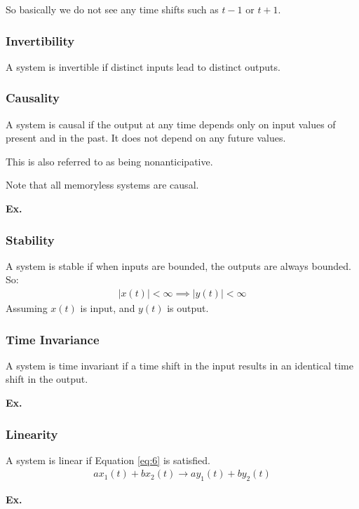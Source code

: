 \documentclass[12pt,letterpaper]{article} \usepackage{amsmath} \usepackage{graphicx} \usepackage[margin=1in]{geometry} \usepackage{longtable}  \usepackage{amssymb}
\begin{document}
	So basically we do not see any time shifts such as $t-1$ or $t+1$.
	
	\subsubsection{Invertibility}
	A system is invertible if distinct inputs lead to distinct outputs. 
	
	\subsubsection{Causality}
	A system is causal if the output at any time depends only on input values of present and in the past. It does not depend on any future values. 
	
	This is also referred to as being nonanticipative.
	
	Note that all memoryless systems are causal.
	\begin{mdframed}
		\textbf{Ex.}
	\end{mdframed}
	
	\subsubsection{Stability}
	A system is stable if when inputs are bounded, the outputs are always bounded. So:
	\begin{align}
		|x(t)| < \infty \implies |y(t)| < \infty 
	\end{align}
	Assuming $x(t)$ is input, and $y(t)$ is output.
	
	\subsubsection{Time Invariance}
	A system is time invariant if a time shift in the input results in an identical time shift in the output. 
	
	\begin{mdframed}
		\textbf{Ex.}
	\end{mdframed}
	
	\subsubsection{Linearity}
	A system is linear if Equation \ref{eq:6} is satisfied.
	\begin{align}
		ax_1 (t) + bx_2 (t) \to ay_1 (t) + by_2(t)\label{eq:6}
	\end{align}
	
	\begin{mdframed}
		\textbf{Ex. }
	\end{mdframed}
	
\end{document}
